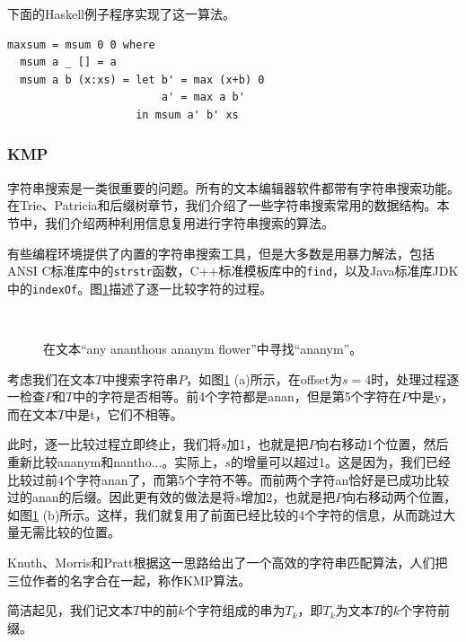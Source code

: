 \documentclass[UTF8]{article}
\begin{document}
下面的Haskell例子程序实现了这一算法。

\lstset{language=Haskell}
\begin{lstlisting}
maxsum = msum 0 0 where
  msum a _ [] = a
  msum a b (x:xs) = let b' = max (x+b) 0
                        a' = max a b'
                    in msum a' b' xs
\end{lstlisting}

\subsubsection{KMP}
 

字符串搜索是一类很重要的问题。所有的文本编辑器软件都带有字符串搜索功能。在Trie、Patricia和后缀树章节，我们介绍了一些字符串搜索常用的数据结构。本节中，我们介绍两种利用信息复用进行字符串搜索的算法。

有些编程环境提供了内置的字符串搜索工具，但是大多数是用暴力解法，包括ANSI C标准库中的\texttt{strstr}函数，C++标准模板库中的\texttt{find}，以及Java标准库JDK中的\texttt{indexOf}。图\ref{fig:strstr}描述了逐一比较字符的过程。

\begin{figure}[htbp]
 \centering
 \subfloat[Offset为$s = 4$，接着，连续有$q=4$个字符相同，但是第5个字符不同。]{} \\
 \subfloat[比较的起始位置移动到$s = 4 + 2 = 6$。]{}
 \caption{在文本“any ananthous ananym flower”中寻找“ananym”。}
 \label{fig:strstr}
\end{figure}

考虑我们在文本$T$中搜索字符串$P$，如图\ref{fig:strstr} (a)所示，在offset为$s=4$时，处理过程逐一检查$P$和$T$中的字符是否相等。前4个字符都是anan，但是第5个字符在$P$中是y，而在文本$T$中是t，它们不相等。

此时，逐一比较过程立即终止，我们将$s$加1，也就是把$P$向右移动1个位置，然后重新比较ananym和nantho...。实际上，$s$的增量可以超过1。这是因为，我们已经比较过前4个字符anan了，而第5个字符不等。而前两个字符an恰好是已成功比较过的anan的后缀。因此更有效的做法是将$s$增加2，也就是把$P$向右移动两个位置，如图\ref{fig:strstr} (b)所示。这样，我们就复用了前面已经比较的4个字符的信息，从而跳过大量无需比较的位置。

Knuth、Morris和Pratt根据这一思路给出了一个高效的字符串匹配算法\cite{kmp}，人们把三位作者的名字合在一起，称作KMP算法。

简洁起见，我们记文本$T$中的前$k$个字符组成的串为$T_k$，即$T_k$为文本$T$的$k$个字符前缀。
\end{document}
